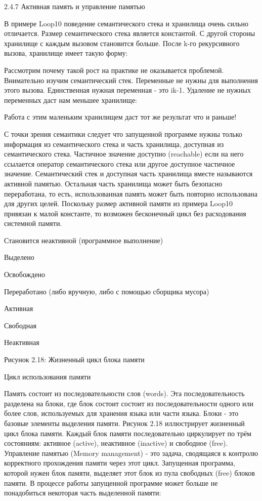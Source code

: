 2.4.7 Активная память и управление памятью

В примере Loop10 поведение семантического стека и хранилища очень сильно отличается. Размер семантического стека является константой. С другой стороны хранилище с каждым вызовом становится больше. После k-го рекурсивного вызова, хранилище имеет такую форму:



Рассмотрим почему такой рост на практике не оказывается проблемой. Внимательно изучим семантический стек. Переменные  не нужны для выполнения этого вызова. Единственная нужная переменная - это ik-1. Удаление не нужных переменных даст нам меньшее хранилище:



Работа с этим маленьким хранилищем даст тот же результат что и раньше!

С точки зрения семантики следует что запущенной программе нужны только информация из семантического стека и часть хранилища, доступная из семантического стека. Частичное значение доступно (reachable) если на него ссылается оператор семантического стека или другое доступное частичное значение. Семантический стек и доступная часть хранилища вместе называются активной памятью. Остальная часть хранилища может быть безопасно переработана, то есть, использованная память может быть повторно использована для других целей. Поскольку размер активной памяти из примера Loop10 привязан к малой константе, то возможен бесконечный цикл без расходования системной памяти.

Становится неактивной (программное выполнение)

Выделено

Освобождено

Переработано (либо вручную, либо с помощью сборщика мусора)

Активная

Свободная

Неактивная

Рисунок 2.18: Жизненный цикл блока памяти

Цикл использования памяти

Память состоит из последовательности слов (words). Эта последовательность разделена на блоки, где блок состоит состоит из последовательности одного или более слов, используемых для хранения языка или части языка. Блоки - это базовые элементы выделения памяти. Рисунок 2.18 иллюстрирует жизненный цикл блока памяти. Каждый блок памяти последовательно циркулирует по трём состояниям: активное (active), неактивное (inactive) и свободное (free). Управление памятью (Memory management) - это задача, сводящаяся к контролю корректного прохождения памяти через этот цикл. Запущенная программа, которой нужен блок памяти, выделяет этот блок из пула свободных (free) блоков памяти. В процессе работы запущенной программе может больше не понадобиться некоторая часть выделенной памяти:

